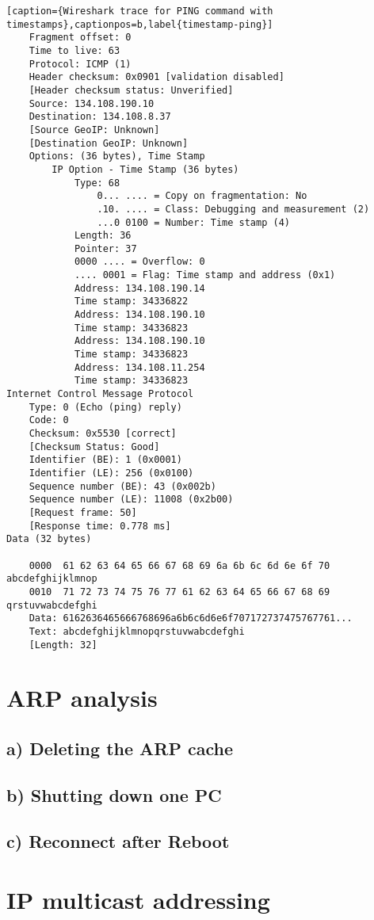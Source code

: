 \begin{lstlisting}[caption={Wireshark trace for PING command with timestamps},captionpos=b,label{timestamp-ping}]
	Fragment offset: 0
	Time to live: 63
	Protocol: ICMP (1)
	Header checksum: 0x0901 [validation disabled]
	[Header checksum status: Unverified]
	Source: 134.108.190.10
	Destination: 134.108.8.37
	[Source GeoIP: Unknown]
	[Destination GeoIP: Unknown]
	Options: (36 bytes), Time Stamp
		IP Option - Time Stamp (36 bytes)
			Type: 68
				0... .... = Copy on fragmentation: No
				.10. .... = Class: Debugging and measurement (2)
				...0 0100 = Number: Time stamp (4)
			Length: 36
			Pointer: 37
			0000 .... = Overflow: 0
			.... 0001 = Flag: Time stamp and address (0x1)
			Address: 134.108.190.14
			Time stamp: 34336822
			Address: 134.108.190.10
			Time stamp: 34336823
			Address: 134.108.190.10
			Time stamp: 34336823
			Address: 134.108.11.254
			Time stamp: 34336823
Internet Control Message Protocol
	Type: 0 (Echo (ping) reply)
	Code: 0
	Checksum: 0x5530 [correct]
	[Checksum Status: Good]
	Identifier (BE): 1 (0x0001)
	Identifier (LE): 256 (0x0100)
	Sequence number (BE): 43 (0x002b)
	Sequence number (LE): 11008 (0x2b00)
	[Request frame: 50]
	[Response time: 0.778 ms]
Data (32 bytes)

	0000  61 62 63 64 65 66 67 68 69 6a 6b 6c 6d 6e 6f 70   abcdefghijklmnop
	0010  71 72 73 74 75 76 77 61 62 63 64 65 66 67 68 69   qrstuvwabcdefghi
	Data: 6162636465666768696a6b6c6d6e6f707172737475767761...
	Text: abcdefghijklmnopqrstuvwabcdefghi
	[Length: 32]

\end{lstlisting}

\section{ARP analysis}
\subsection{a) Deleting the ARP cache}
\subsection{b) Shutting down one PC}
\subsection{c) Reconnect after Reboot}

\section{IP multicast addressing}
